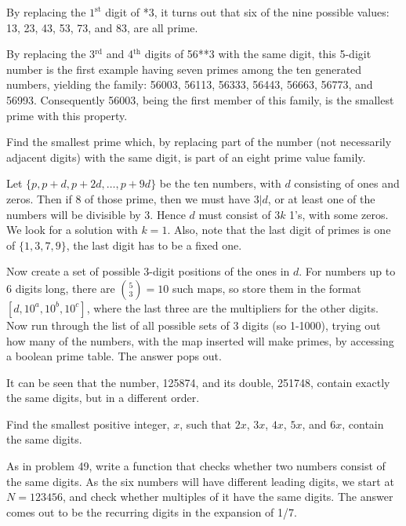 By replacing the $1^{\text{st}}$ digit of *3, it turns out that six of the nine possible values: 13, 23, 43, 53, 73, and 83, are all prime.

By replacing the 3$^\text{rd}$ and 4$^\text{th}$ digits of 56**3 with the same digit, this 5-digit number is the first example having seven primes among the ten generated numbers, yielding the family: 56003, 56113, 56333, 56443, 56663, 56773, and 56993. Consequently 56003, being the first member of this family, is the smallest prime with this property.

Find the smallest prime which, by replacing part of the number (not necessarily adjacent digits) with the same digit, is part of an eight prime value family.


Let $\{p, p+d, p+2d, \dots, p+9d\}$ be the ten numbers, with $d$ consisting of ones and zeros.  Then if 8 of those prime,
then we must have $3|d$, or at least one of the numbers will be divisible by 3.  Hence $d$ must consist of $3k$ 1's, with some zeros.  We look for a solution with $k = 1$.  Also, note that the last digit of primes is one of $\{1, 3, 7, 9\}$, the last digit has to be a fixed one.

Now create a set of possible 3-digit positions of the ones in $d$.  For numbers up to 6 digits long, there are $\binom 5 3 = 10$ such maps, so store them in the format $[d, 10^a, 10^b, 10^c]$, where the last three are the multipliers for the other digits.  Now run through the list of all possible sets of 3 digits (so 1-1000), trying out how many of the numbers, with the map inserted will make primes, by accessing a boolean prime table.  The answer pops out.




It can be seen that the number, 125874, and its double, 251748, contain exactly the same digits, but in a different order.

Find the smallest positive integer, $x$, such that $2x$, $3x$, $4x$, $5x$, and $6x$, contain the same digits.

As in problem 49, write a function that checks whether two numbers consist of the same digits.  As the six numbers will have different leading digits, we start at $N = 123456$, and check whether multiples of it have the same digits.  The answer comes
out to be the recurring digits in the expansion of 1/7.

